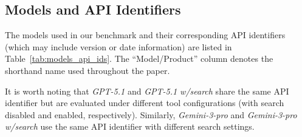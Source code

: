 
\subsection{Models and API Identifiers}
\label{app:models_api_ids}

The models used in our benchmark and their corresponding API identifiers (which may include version or
date information) are listed in Table~\ref{tab:models_api_ids}. The ``Model/Product'' column denotes the
shorthand name used throughout the paper.

It is worth noting that \textit{GPT-5.1} and \textit{GPT-5.1 w/search} share the same API identifier but are
evaluated under different tool configurations (with search disabled and enabled, respectively).
Similarly, \textit{Gemini-3-pro} and \textit{Gemini-3-pro w/search} use the same API identifier with different
search settings.

\begin{table}[t]
\centering
\footnotesize
{}
\caption{Correspondence between model/product names and their API identifiers.}
\label{tab:models_api_ids}
\end{table}


